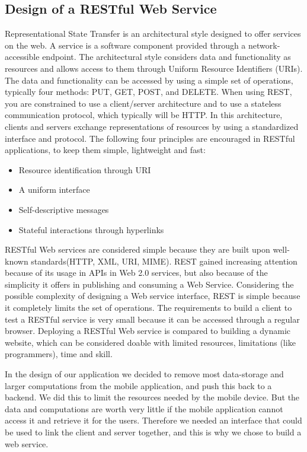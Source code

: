 \subsection{Design of a RESTful Web Service}
\label{subsec:restDes}

Representational State Transfer is an architectural style designed to offer services on the web. A service is a software component provided through a network-accessible endpoint. The architectural style considers data and functionality as resources and allows access to them through Uniform Resource Identifiers (URIs). The data and functionality can be accessed by using a simple set of operations, typically four methods: PUT, GET, POST, and DELETE. When using REST, you are constrained to use a client/server architecture and to use a stateless communication protocol, which typically will be HTTP. In this architecture, clients and servers exchange representations of resources by using a standardized interface and protocol. The following four principles are encouraged in RESTful applications, to keep them simple, lightweight and fast\cite{WhatIsRESTful}\cite{DecidingOnRESTful}:

\begin{itemize}
\item Resource identification through URI
\item A uniform interface
\item Self-descriptive messages
\item Stateful interactions through hyperlinks
\end{itemize}

RESTful Web services are considered simple because they are built upon well-known standards(HTTP, XML, URI, MIME). REST gained increasing attention because of its usage in APIs in Web 2.0 services, but also because of the simplicity it offers in publishing and consuming a Web Service. Considering the possible complexity of designing a Web service interface, REST is simple because it completely limits the set of operations. The requirements to build a client to test a RESTful service is very small because it can be accessed through a regular browser. Deploying a RESTful Web service is compared to building a dynamic website, which can be considered doable with limited resources, limitations (like programmers), time and skill. \cite{DecidingOnRESTful}

In the design of our application we decided to remove most data-storage and larger computations from the mobile application, and push this back to a backend. We did this to limit the resources needed by the mobile device. But the data and computations are worth very little if the mobile application cannot access it and retrieve it for the users. Therefore we needed an interface that could be used to link the client and server together, and this is why we chose to build a web service.


